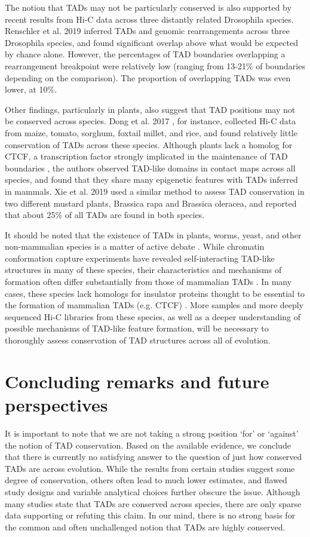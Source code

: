 The notion that TADs may not be particularly conserved is also supported by recent results from Hi-C data across three distantly related Drosophila species. Renschler et al. 2019 \cite{Renschler.2019} inferred TADs and genomic rearrangements across three Drosophila species, and found significant overlap above what would be expected by chance alone. However, the percentages of TAD boundaries overlapping a rearrangement breakpoint were relatively low (ranging from 13-21\% of boundaries depending on the comparison). The proportion of overlapping TADs was even lower, at 10\%.
 
Other findings, particularly in plants, also suggest that TAD positions may not be conserved across species. Dong et al. 2017 \cite{Dong.2017}, for instance, collected Hi-C data from maize, tomato, sorghum, foxtail millet, and rice, and found relatively little conservation of TADs across these species. Although plants lack a homolog for CTCF, a transcription factor strongly implicated in the maintenance of TAD boundaries \cite{Guo.2015, Rudan.2015, Kentepozidou.2020, Gomez-marin.2015}, the authors observed TAD-like domains in contact maps across all species, and found that they share many epigenetic features with TADs inferred in mammals. Xie et al. 2019 \cite{Xie.2019} used a similar method to assess TAD conservation in two different mustard plants, Brassica rapa and Brassica oleracea, and reported that about 25\% of all TADs are found in both species.

It should be noted that the existence of TADs in plants, worms, yeast, and other non-mammalian species is a matter of active debate \cite{Bonev.2016}. While chromatin conformation capture experiments have revealed self-interacting TAD-like structures in many of these species, their characteristics and mechanisms of formation often differ substantially from those of mammalian TADs \cite{Szabo.2019, Acemel.2017}. In many cases, these species lack homologs for insulator proteins thought to be essential to the formation of mammalian TADs (e.g. CTCF) \cite{Szabo.2019}. More samples and more deeply sequenced Hi-C libraries from these species, as well as a deeper understanding of possible mechanisms of TAD-like feature formation, will be necessary to thoroughly assess conservation of TAD structures across all of evolution.

\section{Concluding remarks and future perspectives}
It is important to note that we are not taking a strong position `for' or `against' the notion of TAD conservation. Based on the available evidence, we conclude that there is currently no satisfying answer to the question of just how conserved TADs are across evolution. While the results from certain studies suggest some degree of conservation, others often lead to much lower estimates, and flawed study designs and variable analytical choices further obscure the issue. Although many studies state that TADs are conserved across species, there are only sparse data supporting or refuting this claim. In our mind, there is no strong basis for the common and often unchallenged notion that TADs are highly conserved. 

